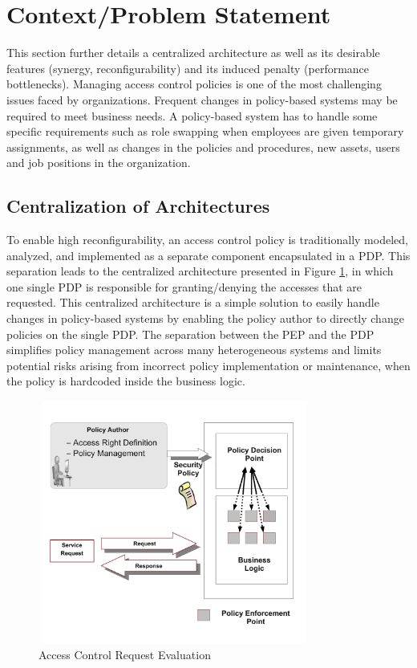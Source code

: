 
\section{Context/Problem Statement} \label{sec:context}
This section further details a centralized architecture as well as its desirable features (synergy, reconfigurability) and its induced penalty (performance bottlenecks). 
Managing access control policies is one of the most challenging issues faced by organizations. Frequent changes in policy-based systems may be required to meet business needs. 
A policy-based system has to handle some specific requirements such as role swapping when employees are given temporary assignments, as well as changes in the policies and procedures, 
new assets, users and job positions in the organization.

\subsection{Centralization of Architectures}
To enable high reconfigurability, an access control policy is traditionally modeled, analyzed, and implemented as a separate component 
encapsulated in a PDP. This separation leads to the centralized architecture presented in Figure \ref{pep-pdp}, in which one single PDP is responsible for granting/denying the accesses that are requested. 
This centralized architecture is a simple solution to easily handle changes in policy-based systems by enabling the policy author 
to directly change policies on the single PDP. The separation between the PEP and the PDP simplifies policy management across many heterogeneous systems and limits
potential risks arising from incorrect policy implementation or maintenance, when the policy is hardcoded inside the business logic.

\begin{figure}[!h]
\begin{center}
\includegraphics[width=9cm, height=8cm]{business-logic}
\caption{Access Control Request Evaluation}
\label{pep-pdp}
\end{center}
\end{figure}

